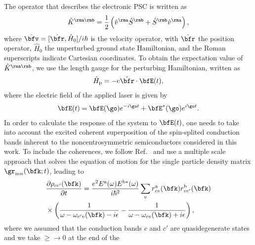 \documentclass[prb,11pt,tightenlines,twocolumn,aps]{revtex4-1}
\begin{document}
The operator that describes the electronic PSC is written as
\begin{align}\label{z.1}
\hat K^{\rma\rmb}=\frac{1}{2}\left( \hat v^\rma \hat S^\rmb 
+\hat  S^\rmb \hat v^\rma\right) 
,
\end{align} 
where $\hat\bfv=[\hat\bfr,\hat H_0]/i\hbar$ is the velocity operator, with
$\hat \bfr$ the position operator,  $\hat H_0$ the unperturbed
ground state Hamiltonian, and
the Roman superscripts  indicate Cartesian coordinates. 
To obtain the expectation value of 
$\hat K^{\rma\rmb}$, we use the length gauge for the perturbing
Hamiltonian, written as
\begin{align}\label{z.2}
\hat H_{\text{p}}=-e\hat\bfr\cdot\bfE(t)
,
\end{align}   
where the electric field of the applied laser is given by
\begin{align}\label{z.3}
\bfE(t)= \bfE(\go)e^{-i\go t} + \bfE^*(\go)e^{i\go t}
.
\end{align}
In order to 
calculate the response of the system to $\bfE(t)$, one needs to
take into account the excited coherent superposition
of the spin-splited conduction bands inherent to the 
noncentrosymmetric 
semiconductors considered in this work.
To include the coherences, we follow Ref.~ and
use a multiple
scale approach that solves the equation of motion for the single
particle density matrix $\gr_{mn}(\bfk;t)$, leading to
\begin{align}\label{z.4}
&\frac{\partial \rho_{cc'}(\bfk)}{\partial t} =
\frac{e^{2}E^{\mathrm{a}}(\omega)E^{\mathrm{b*}}(\omega)}
{i \hbar^{2}}
\sum_{v}r^{\mathrm{a}}_{cv}(\bfk) r^{\mathrm{b}}_{vc'}(\bfk)
\nonumber\\
&\times 
\left( \frac{1}{\omega - \omega_{c'v}(\bfk) - i \epsilon} 
- 
\frac{1}{\omega - \omega_{cv}(\bfk) + i \epsilon} \right)
,
\end{align}
where we assumed that the conduction bands $c$ and $c'$
are quasidegenerate  states and we take $\ge\to 0$ at the end of the
\end{document}
